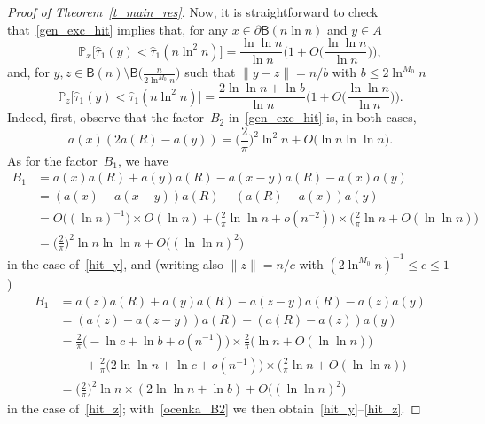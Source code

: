 \documentclass[AHL,Unicode,longabstracts]{cedram}
\newcommand{\1}[1]{{\mathbf 1}{\{#1\}}}
\newcommand{\8}{{\infty}}
\newcommand{\IP}{{\mathbb P}}
\newcommand{\htau}{\widehat{\tau}}
\newcommand{\B}{{\mathsf B}}
\begin{document}
\begin{proof}[Proof of Theorem~\ref{t_main_res}]
Now, it is straightforward to check that~\eqref{gen_exc_hit} implies that, for any $x\in \partial\B(n\ln n)$ and $y \in A$
\begin{equation}\label{hit_y}
\IP_x\big[\htau_1(y)<\htau_1(n\ln^2 n)\big] = \frac{\ln\ln n}{\ln n}
\Big(1+O\Big(\frac{\ln\ln n}{\ln n}\Big)\Big),
\end{equation}
and, for $y,z\in \B(n)\setminus\B\big(\frac{n}{2\ln^{M_0}n}\big)$ such that $\|y-z\| = n/b$ with $b\leq 2\ln^{M_0}n$
\begin{equation}\label{hit_z}
\IP_z\big[\htau_1(y)<\htau_1(n\ln^2 n)\big] =
\frac{2\ln\ln n + \ln b}{\ln n}
\Big(1+O\Big(\frac{\ln\ln n}{\ln n}\Big)\Big).
\end{equation}
Indeed, first, observe that the factor~$B_2$ in~\eqref{gen_exc_hit} is, in both cases,
\begin{equation}\label{ocenka_B2}
a(x)(2a(R)-a(y)) = \Big(\frac{2}{\pi}\Big)^2
\ln^2 n + O\big(\ln n\ln\ln n\big).
\end{equation}
As for the factor~$B_1$, we have
\begin{align*}
B_1 &= a(x)a(R)+a(y)a(R)-a(x-y)a(R)-a(x)a(y)\\
&= (a(x)-a(x-y))a(R) - (a(R)-a(x))a(y)\\
&= O\big((\ln n)^{-1}\big)\times O(\ln n) + \Big(\frac{2}{\pi}\ln\ln n + o(n^{-2})\Big)
\times \Big(\frac{2}{\pi}\ln n + O(\ln\ln n)\Big)\\
&= \Big(\frac{2}{\pi}\Big)^2
\ln n\ln\ln n + O\big((\ln\ln n)^2\big)
\end{align*}
in the case of~\eqref{hit_y}, and (writing also $\|z\|=n/c$ with $(2\ln^{M_0} n)^{-1}\leq c\leq 1$)
\begin{align*}
B_1 &= a(z)a(R)+a(y)a(R)-a(z-y)a(R)-a(z)a(y)\\
&= (a(z)-a(z-y))a(R) - (a(R)-a(z))a(y)\\
&= \frac{2}{\pi}\big(-\ln c +\ln b + o(n^{-1})\big)
\times \frac{2}{\pi}\big(\ln n + O(\ln\ln n)\big)\\
& \qquad + \frac{2}{\pi}\big(2\ln\ln n +\ln c + o(n^{-1})\big)
\times \Big(\frac{2}{\pi}\ln n + O(\ln\ln n)\Big)\\
&= \Big(\frac{2}{\pi}\Big)^2
\ln n\times(2\ln\ln n + \ln b) + O\big((\ln\ln n)^2\big)
\end{align*}
in the case of~\eqref{hit_z}; with~\eqref{ocenka_B2} we then obtain~\eqref{hit_y}--\eqref{hit_z}.


\end{proof}
\end{document}
